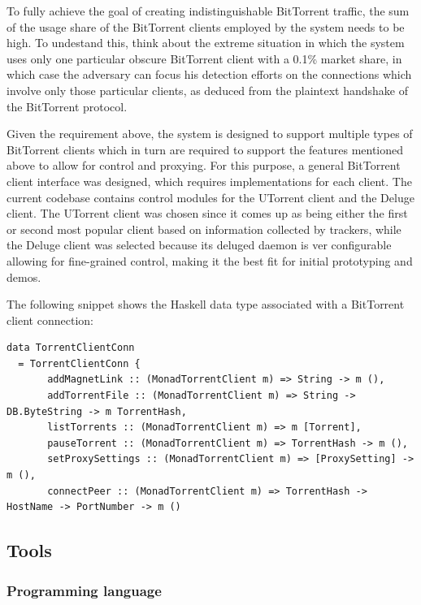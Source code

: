 \documentclass[11pt]{article} %
\begin{document}
To fully achieve the goal of creating indistinguishable BitTorrent traffic, the sum of the usage share of the BitTorrent clients employed by the system needs to be high. To undestand this, think about the extreme situation in which the system uses only one particular obscure BitTorrent client with a 0.1\% market share, in which case the adversary can focus his detection efforts on the connections which involve only those particular clients, as deduced from the plaintext handshake of the BitTorrent protocol.

Given the requirement above, the system is designed to support multiple types of BitTorrent clients which in turn are required to support the features mentioned above to allow for control and proxying. For this purpose, a general BitTorrent client interface was designed, which requires implementations for each client. The current codebase contains control modules for the UTorrent client and the Deluge client. The UTorrent client  was chosen since it comes up as being either the first or second most popular client based on information collected by trackers, while the Deluge client was selected because its deluged daemon is ver configurable allowing for fine-grained control, making it the best fit for initial prototyping and demos. 

The following snippet shows the Haskell  data type associated with a BitTorrent client connection: 

\begin{lstlisting}
data TorrentClientConn
  = TorrentClientConn {
       addMagnetLink :: (MonadTorrentClient m) => String -> m (),
       addTorrentFile :: (MonadTorrentClient m) => String -> DB.ByteString -> m TorrentHash,
       listTorrents :: (MonadTorrentClient m) => m [Torrent],
       pauseTorrent :: (MonadTorrentClient m) => TorrentHash -> m (),
       setProxySettings :: (MonadTorrentClient m) => [ProxySetting] -> m (),
       connectPeer :: (MonadTorrentClient m) => TorrentHash -> HostName -> PortNumber -> m ()
\end{lstlisting}

\subsection{Tools}


\subsubsection{Programming language}
\end{document}
